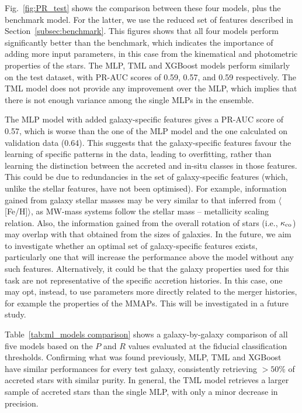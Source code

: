 Fig.~\ref{fig:PR_test} shows the comparison between these four models, plus the benchmark model. For the latter, we use the reduced set of features described in Section~\ref{subsec:benchmark}. This figures shows that all four models perform significantly better than the benchmark, which indicates the importance of adding more input parameters, in this case from the kinematical and photometric properties of the stars. The MLP, TML and XGBoost models perform similarly on the test dataset, with PR-AUC scores of 0.59, 0.57, and 0.59 respectively. The TML model does  not provide any improvement over the MLP, which implies that there is not enough variance among the single MLPs in the ensemble.

The MLP model with added galaxy-specific features gives a PR-AUC score of 0.57, which is worse than the one of the MLP model and the one calculated on validation data (0.64). This suggests that the galaxy-specific features favour the learning of specific patterns in the data, leading to overfitting, rather than learning the distinction between the accreted and in-situ classes in those features. This could be due to redundancies in the set of galaxy-specific features (which, unlike the stellar features, have not been optimised). For example, information gained from galaxy stellar masses may be very similar to that inferred from $\langle$[Fe/H]$\rangle$, as MW-mass systems follow the stellar mass -- metallicity scaling relation. Also, the information gained from the overall rotation of stars (i.e., $\kappa_{\rm co}$) may overlap with that obtained from the sizes of galaxies. In the future, we aim to investigate whether an optimal set of galaxy-specific features exists, particularly one that will increase the performance above the model without any such features. Alternatively, it could be that the galaxy properties used for this task are not representative of the specific accretion histories. In this case, one may opt, instead, to use parameters more directly related to the merger histories, for example the properties of the MMAPs. This will be investigated in a future study.

Table~\ref{tab:ml_models comparison} shows a galaxy-by-galaxy comparison of all five models based on the $P$ and $R$ values evaluated at the fiducial classification thresholds. Confirming what was found previously, MLP, TML and XGBoost have similar performances for every test galaxy,  consistently retrieving $>50\%$ of accreted stars with similar purity. In general, the TML model retrieves a larger sample of accreted stars than the single MLP, with only a minor decrease in precision.


